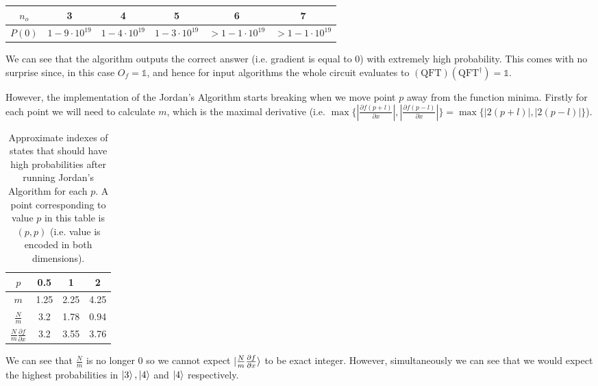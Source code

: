 \documentclass{article}
\newcommand{\identity}{\mathds{1}}
\begin{document}
\begin{table}[h]
    \centering
    \begin{tabular}{|c||c c c c c|}
        \hline
        $n_o$ & 3 & 4 & 5 & 6 & 7 \\
        \hline
        $P(0)$ & $1 - 9 \cdot 10^{19}$ & $1 - 4 \cdot 10^{19}$ & $1 - 3 \cdot 10^{19}$ & $> 1 - 1 \cdot 10^{19}$ & $> 1 - 1 \cdot 10^{19}$ \\
        \hline
    \end{tabular}
\end{table}

We can see that the algorithm outputs the correct answer (i.e. gradient is equal to $0$) with extremely high probability.
This comes with no surprise since, in this case $O_f = \identity$, and hence for input algorithms the whole circuit evaluates to
$(\text{QFT})(\text{QFT}^\dagger) = \identity$.

However, the implementation of the Jordan's Algorithm starts breaking when we move point $p$ away from the function minima.
Firstly for each point we will need to calculate $m$, which is the maximal derivative
(i.e. $\max \{|\frac{\partial f(p + l)}{\partial x}|, |\frac{\partial f(p - l)}{\partial x}|\} =
\max \{|2(p + l)|, |2(p - l)|\}$).

\begin{table}[h]
    \centering
    \begin{tabular}{|c||c c c|}
        \hline
        $p$ & 0.5 & 1 & 2 \\
        \hline
        $m$ & 1.25 & 2.25 & 4.25 \\
        \hline
        $\frac{N}{m}$ & 3.2 & 1.78 & 0.94 \\
        \hline
        $\frac{N}{m}\frac{\partial f}{\partial x}$ & 3.2 & 3.55 & 3.76 \\
        \hline
    \end{tabular}
    \caption{
        Approximate indexes of states that should have high probabilities after running Jordan's Algorithm for each $p$.
        A point corresponding to value $p$ in this table is $(p, p)$
        (i.e. value is encoded in both dimensions).
    }
    \label{tab:N-m-calc}
\end{table}

We can see that $\frac{N}{m}$ is no longer $0$ so we cannot expect $\ket{\frac{N}{m}\frac{\partial f}{\partial x}}$ to be exact integer.
However, simultaneously we can see that we would expect the highest probabilities in $\ket{3}, \ket{4}$ and $\ket{4}$ respectively.
\end{document}
